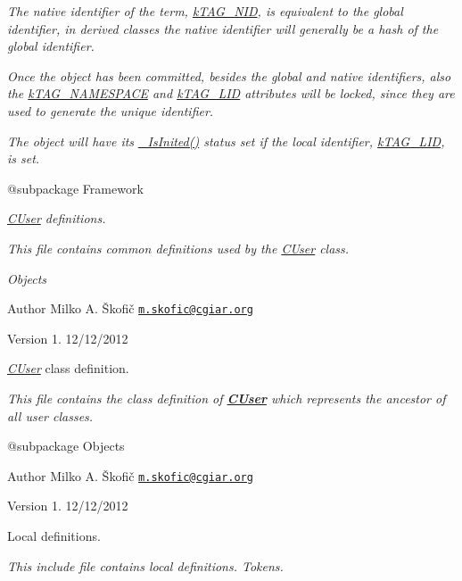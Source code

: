 {\itshape The native identifier of the term, \hyperlink{}{k\-T\-A\-G\-\_\-\-N\-I\-D}, is equivalent to the global identifier, in derived classes the native identifier will generally be a hash of the global identifier.}

{\itshape Once the object has been committed, besides the global and native identifiers, also the \hyperlink{}{k\-T\-A\-G\-\_\-\-N\-A\-M\-E\-S\-P\-A\-C\-E} and \hyperlink{}{k\-T\-A\-G\-\_\-\-L\-I\-D} attributes will be locked, since they are used to generate the unique identifier.}

{\itshape The object will have its \hyperlink{}{\-\_\-\-Is\-Inited()} status set if the local identifier, \hyperlink{}{k\-T\-A\-G\-\_\-\-L\-I\-D}, is set.}

{\itshape \begin{DoxyVerb} @subpackage        Framework\end{DoxyVerb}
}

{\itshape \hyperlink{class_c_user}{C\-User} definitions.}

{\itshape This file contains common definitions used by the \hyperlink{class_c_user}{C\-User} class.}

{\itshape  Objects}

{\itshape \begin{DoxyAuthor}{Author}
Milko A. Škofič \href{mailto:m.skofic@cgiar.org}{\tt m.\-skofic@cgiar.\-org} 
\end{DoxyAuthor}
\begin{DoxyVersion}{Version}
1. 12/12/2012
\end{DoxyVersion}
{\itshape \hyperlink{class_c_user}{C\-User}} class definition.}

{\itshape This file contains the class definition of {\bfseries \hyperlink{class_c_user}{C\-User}} which represents the ancestor of all user classes.}

{\itshape \begin{DoxyVerb} @subpackage        Objects
\end{DoxyVerb}
}

{\itshape \begin{DoxyAuthor}{Author}
Milko A. Škofič \href{mailto:m.skofic@cgiar.org}{\tt m.\-skofic@cgiar.\-org} 
\end{DoxyAuthor}
\begin{DoxyVersion}{Version}
1. 12/12/2012
\end{DoxyVersion}
Local definitions.}

{\itshape This include file contains local definitions. Tokens.}

